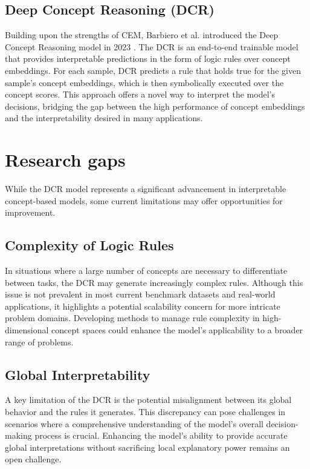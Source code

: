 \documentclass[sigconf, nonacm]{acmart}
\begin{document}
\subsection{Deep Concept Reasoning (DCR)}
\vspace{2pt}
Building upon the strengths of CEM, Barbiero et al. introduced the Deep Concept Reasoning model in 2023 \cite{barbiero2023interpretable}. The DCR is an end-to-end trainable model that provides interpretable predictions in the form of logic rules over concept embeddings. For each sample, DCR predicts a rule that holds true for the given sample's concept embeddings, which is then symbolically executed over the concept scores. This approach offers a novel way to interpret the model's decisions, bridging the gap between the high performance of concept embeddings and the interpretability desired in many applications. \vspace{8pt}

\section{Research gaps}
\vspace{2pt}
While the DCR model represents a significant advancement in interpretable concept-based models, some current limitations may offer opportunities for improvement. \vspace{6pt}

\subsection{Complexity of Logic Rules}
\vspace{2pt}
In situations where a large number of concepts are necessary to differentiate between tasks, the DCR may generate increasingly complex rules. Although this issue is not prevalent in most current benchmark datasets and real-world applications, it highlights a potential scalability concern for more intricate problem domains. Developing methods to manage rule complexity in high-dimensional concept spaces could enhance the model's applicability to a broader range of problems. \vspace{6pt}

\subsection{Global Interpretability}
\vspace{2pt}
A key limitation of the DCR is the potential misalignment between its global behavior and the rules it generates. This discrepancy can pose challenges in scenarios where a comprehensive understanding of the model's overall decision-making process is crucial. Enhancing the model's ability to provide accurate global interpretations without sacrificing local explanatory power remains an open challenge. \vspace{6pt}
\end{document}
